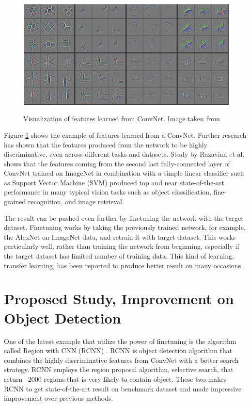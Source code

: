 \documentclass[a4paper,11pt]{kth-mag}
\begin{document}
\begin{figure}[h]
\centering
\includegraphics[scale=0.3]{image/cnn.png}
\label{fig:convnet_features}
\caption{Visualization of features learned from ConvNet. Image taken from \cite{zeiler}}
\end{figure}

Figure \ref{fig:convnet_features} shows the example of features learned from a ConvNet. Further research has shown that the features produced from the network to be highly discriminative, even across different tasks and datasets. Study by Razavian et al. \cite{razavian2014} shows that the features coming from the second last fully-connected layer of ConvNet trained on ImageNet in combination with a simple linear classifier such as Support Vector Machine (SVM) produced top and near state-of-the-art performance in many typical vision tasks such as object classification, fine-grained recognition, and image retrieval.

The result can be pushed even further by finetuning the network with the target dataset. Finetuning works by taking the previously trained network, for example, the AlexNet on ImageNet data, and retrain it with target dataset. This works particularly well, rather than training the network from beginning, especially if the target dataset has limited number of training data. This kind of learning, transfer learning, has been reported to produce better result on many occasions \cite{azizpour2014}.

\section{Proposed Study, Improvement on Object Detection}
One of the latest example that utilize the power of finetuning is the algorithm called Region with CNN (RCNN) \cite{girshick2014rcnn}. RCNN is object detection algorithm that combines the highly discriminative features from ConvNet with a better search strategy. RCNN employs the region proposal algorithm, selective search, that return ~2000 regions that is very likely to contain object. These two makes RCNN to get state-of-the-art result on benchmark dataset and made impressive improvement over previous methods.
\end{document}
